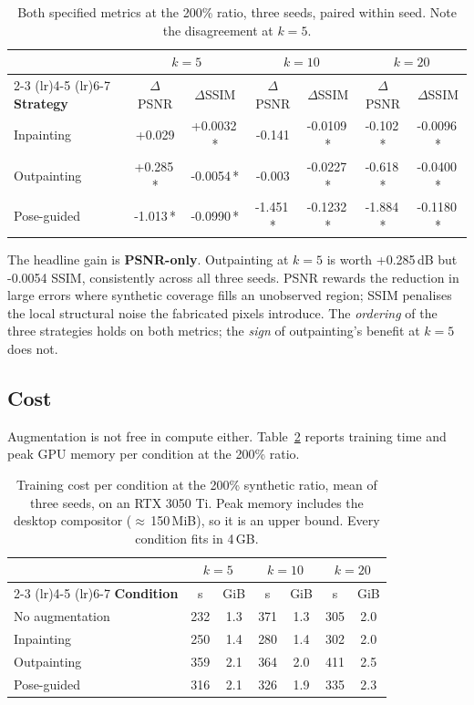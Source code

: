 \documentclass{article}
\begin{document}
\begin{table}[htbp]
  \centering
  \caption{Both specified metrics at the 200\% ratio, three seeds, paired
  within seed. Note the disagreement at $k = 5$.}
  \label{tab:metrics}
  \begin{tabular}{lcccccc}
    \toprule
    & \multicolumn{2}{c}{$k = 5$} & \multicolumn{2}{c}{$k = 10$}
    & \multicolumn{2}{c}{$k = 20$} \\
    \cmidrule(lr){2-3} \cmidrule(lr){4-5} \cmidrule(lr){6-7}
    \textbf{Strategy} & $\Delta$PSNR & $\Delta$SSIM & $\Delta$PSNR
    & $\Delta$SSIM & $\Delta$PSNR & $\Delta$SSIM \\
    \midrule
    Inpainting & +0.029 & +0.0032\,* & -0.141 & -0.0109\,* & -0.102\,* & -0.0096\,* \\
    Outpainting & +0.285\,* & -0.0054\,* & -0.003 & -0.0227\,* & -0.618\,* & -0.0400\,* \\
    Pose-guided & -1.013\,* & -0.0990\,* & -1.451\,* & -0.1232\,* & -1.884\,* & -0.1180\,* \\
    \bottomrule
  \end{tabular}
\end{table}

The headline gain is \textbf{PSNR-only}. Outpainting at $k = 5$ is worth
+0.285\,dB but -0.0054 SSIM, consistently across all three seeds. PSNR rewards
the reduction in large errors where synthetic coverage fills an unobserved
region; SSIM penalises the local structural noise the fabricated pixels
introduce. The \emph{ordering} of the three strategies holds on both metrics;
the \emph{sign} of outpainting's benefit at $k = 5$ does not.

\subsection{Cost}

Augmentation is not free in compute either. Table~\ref{tab:cost} reports
training time and peak GPU memory per condition at the 200\% ratio.

\begin{table}[htbp]
  \centering
  \caption{Training cost per condition at the 200\% synthetic ratio, mean of
  three seeds, on an RTX 3050 Ti. Peak memory includes the desktop compositor
  ($\approx$\,150\,MiB), so it is an upper bound. Every condition fits in
  4\,GB.}
  \label{tab:cost}
  \begin{tabular}{lcccccc}
    \toprule
    & \multicolumn{2}{c}{$k = 5$} & \multicolumn{2}{c}{$k = 10$}
    & \multicolumn{2}{c}{$k = 20$} \\
    \cmidrule(lr){2-3} \cmidrule(lr){4-5} \cmidrule(lr){6-7}
    \textbf{Condition} & s & GiB & s & GiB & s & GiB \\
    \midrule
    No augmentation & 232 & 1.3 & 371 & 1.3 & 305 & 2.0 \\
    Inpainting & 250 & 1.4 & 280 & 1.4 & 302 & 2.0 \\
    Outpainting & 359 & 2.1 & 364 & 2.0 & 411 & 2.5 \\
    Pose-guided & 316 & 2.1 & 326 & 1.9 & 335 & 2.3 \\
    \bottomrule
  \end{tabular}
\end{table}
\end{document}
